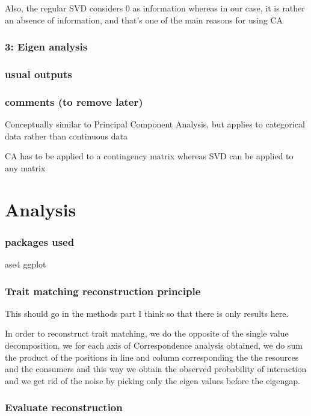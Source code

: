 \documentclass{article}
\begin{document}
Also, the regular SVD considers 0 as information whereas in our case, it is rather an absence of information, and that's one of the main reasons for using CA

\subsubsection{3: Eigen analysis}

\subsubsection{usual outputs}
\subsubsection{comments (to remove later)}
Conceptually similar to Principal Component Analysis, but applies to categorical data rather than continuous data

CA has to be applied to a contingency matrix whereas SVD can be applied to any matrix






\section{Analysis}

\subsubsection{packages used}

ase4 ggplot

\subsubsection{Trait matching reconstruction principle}

This should go in the methods part I think so that there is only results here.

In order to reconstruct trait matching, we do the opposite of the single value decomposition, we for each axis of Correspondence analysis obtained, we do sum the product of the positions in line and column corresponding the the resources and the consumers and this way we obtain the observed probability of interaction and we get rid of the noise by picking only the eigen values before the eigengap.

\subsubsection{Evaluate reconstruction}
\end{document}
